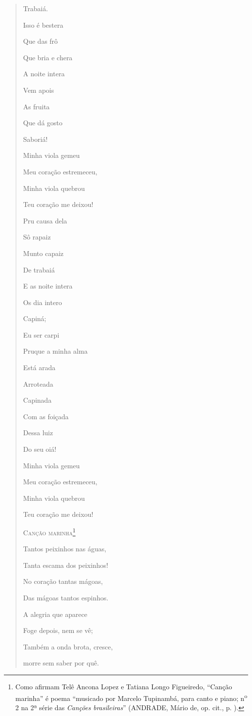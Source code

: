 \begin{verse}
Trabaiá.

Isso é bestera

Que das frô

Que bria e chera

A noite intera

Vem apois

As fruita

Que dá gosto

Saboriá!

Minha viola gemeu

Meu coração estremeceu,

Minha viola quebrou

Teu coração me deixou!

Pru causa dela

Sô rapaiz

Munto capaiz

De trabaiá

E as noite intera

Os dia intero

Capiná;

Eu ser carpi

Pruque a minha alma

Está arada

Arroteada

Capinada

Com as foiçada

Dessa luiz

Do seu oiá!

Minha viola gemeu

Meu coração estremeceu,

Minha viola quebrou

Teu coração me deixou!

\textsc{Canção marinha}\footnote{Como afirmam Telê Ancona Lopez e
  Tatiana Longo Figueiredo, ``Canção marinha'' é poema ``musicado por
  Marcelo Tupinambá, para canto e piano; n\textsuperscript{o} 2 na 2ª
  série das \emph{Canções brasileiras}'' (ANDRADE, Mário de, op. cit.,
  p. ).}

Tantos peixinhos nas águas,

Tanta escama dos peixinhos!

No coração tantas mágoas,

Das mágoas tantos espinhos.

A alegria que aparece

Foge depois, nem se vê;

Também a onda brota, cresce,

morre sem saber por quê.


\end{verse}

